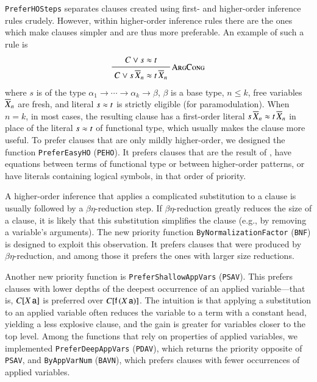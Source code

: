 \verb|PreferHOSteps| separates clauses created using first-
and higher-order inference rules crudely. However, within higher-order
inference rules there are the ones which make clauses simpler and are thus more
preferable. An example of such a rule is
%
\[\namedinference{\infname{ArgCong}}{C \lor s \eq t}{C \lor s \, \tuplen{X}
\eq t \, \tuplen{X}}\]
%
where $s$ is of the type $\alpha_1 \rightarrow \cdots \rightarrow \alpha_k
\rightarrow \beta$, $\beta$ is a base type, $n \leq k$, free variables
$\overline{X}_{n}$ are fresh, and literal $s \approx t$ is strictly eligible (for paramodulation). When $n =
k$, in most cases, the resulting clause has a first-order literal $s \, \overline{X}_{n}
\approx t \, \overline{X}_{n}$ in place of the literal $s \approx t$ of functional type, which usually makes the clause more useful. To
prefer clauses that are only mildly higher-order, we designed the function
\verb|PreferEasyHO| (\verb|PEHO|). It prefers clauses that are the result of
, have equations between terms of functional type or
between higher-order patterns, or have literals containing logical symbols, in that
order of priority.

A higher-order inference that applies a complicated substitution to a clause is
usually followed by a $\beta\eta$-reduction step. If
$\beta\eta$-reduction greatly reduces the size of a clause, it is likely
that this substitution simplifies the clause (e.g., by removing a variable's
arguments). The new priority function \verb|ByNormalizationFactor| (\verb|BNF|)
is designed to exploit this observation. It prefers clauses that were produced
by $\beta\eta$-reduction, and among those it prefers the ones with larger
size reductions.

Another new priority function is \verb|PreferShallowAppVars| (\verb|PSAV|). This
prefers clauses with lower depths of the deepest occurrence of an applied
variable---that is, $C[X \, \mathsf{a}]$ is preferred over $C[\mathsf{f}\,(X \,
\mathsf{a})]$. The intuition is that applying a substitution to an applied
variable often reduces the variable to a term with a constant head,
yielding a less explosive clause, and the gain is greater for variables closer
to the top level.  Among the functions that rely
on properties of applied variables, we implemented \verb|PreferDeepAppVars|
(\verb|PDAV|), which returns the priority opposite of \verb|PSAV|, and
\verb|ByAppVarNum| (\verb|BAVN|), which prefers clauses with fewer occurrences
of applied variables.




